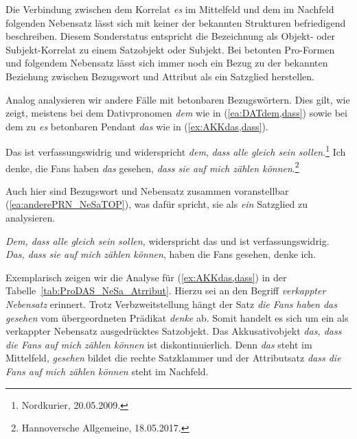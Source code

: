 Die Verbindung zwischen dem Korrelat \textit{es} im Mittelfeld und dem im Nachfeld folgenden Nebensatz lässt sich mit keiner der bekannten Strukturen befriedigend beschreiben. Diesem Sonderstatus entspricht die Bezeichnung als Objekt- oder Subjekt-Korrelat zu einem Satzobjekt oder Subjekt. Bei betonten Pro-Formen und folgendem Nebensatz lässt sich immer noch ein Bezug zu der bekannten Beziehung zwischen Bezugswort und Attribut als ein Satzglied herstellen. 

Analog analysieren wir andere Fälle mit betonbaren Bezugswörtern. Dies gilt, wie \citet[437]{Wegener2013} zeigt, meistens bei dem Dativpronomen \textit{dem} wie in (\ref{ea:DATdem,dass}) sowie bei dem zu \textit{es} betonbaren Pendant \textit{das} wie in (\ref{ex:AKKdas,dass}).

\ea \label{ea:anderePRN_NeSa}
\ea \label{ea:DATdem,dass} Das ist verfassungswidrig und widerspricht \textit{dem}, \textit{dass alle gleich sein sollen}.\footnote{Nordkurier, 20.05.2009.}
\ex \label{ex:AKKdas,dass} Ich denke, die Fans haben \textit{das} gesehen, \textit{dass sie auf mich zählen können}.\footnote{Hannoversche Allgemeine, 18.05.2017.}
\z 
\z 

Auch hier sind Bezugswort und Nebensatz zusammen voranstellbar (\ref{ea:anderePRN_NeSaTOP}), was dafür spricht, sie als \textit{ein} Satzglied zu analysieren.

\ea \label{ea:anderePRN_NeSaTOP}
\ea \label{ea:DATdem,dassTOP} \textit{Dem, dass alle gleich sein sollen,} widerspricht das und ist verfassungswidrig. 
\ex \label{ex:AKKdas,dassTOP} \textit{Das, dass sie auf mich zählen können}, haben die Fans gesehen, denke ich. 
\z 
\z 

Exemplarisch zeigen wir die Analyse für (\ref{ex:AKKdas,dass}) in der Tabelle~\ref{tab:ProDAS_NeSa_Atrribut}. Hierzu sei an den Begriff \textit{verkappter Nebensatz} erinnert. Trotz Verbzweitstellung hängt der Satz \textit{die Fans haben das gesehen} vom übergeordneten Prädikat \textit{denke} ab. Somit handelt es sich um ein als verkappter Nebensatz ausgedrücktes Satzobjekt. Das Akkusativobjekt \textit{das, dass die Fans auf mich zählen können} ist diskontinuierlich. Denn \textit{das} steht im Mittelfeld, \textit{gesehen} bildet die rechte Satzklammer und der Attributsatz \textit{dass die Fans auf mich zählen können} steht im Nachfeld. 

